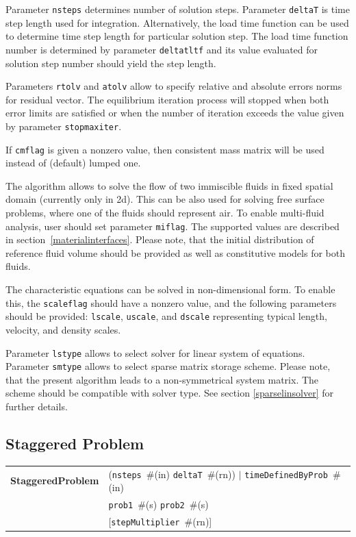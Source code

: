 \documentclass[a4paper]{article}
\makeatletter
\newcommand{\param}[1]{\texttt{#1}} %
\newcommand{\optional}[1]{[#1]} %
\newcommand{\field}[2]{\param{#1}~\#{\tiny(#2)}} %
\newcommand{\optField}[2]{\optional{\field{#1}{#2}}}
\newcommand{\entKeywordInst}[1]{\textbf{#1}} %
\newenvironment{record}[1][]{\begin{tabular}{|ll}}{\end{tabular}\\}
\newcommand{\recentry}[2]{{#1}&{#2}\\}
\newcounter{rcc}
\newenvironment{record}[1][\textwidth]{\setcounter{rcc}{0}\begin{tabular*}{#1}{|ll@{\extracolsep{\fill}}r}}{\end{tabular*}\\}
\newcommand{\recentry}[2]{\ifthenelse{\value{rcc}>0}{&$\backslash$ \\}{\setcounter{rcc}{1}}{#1}&{#2}}
\makeatother
\begin{document}
Parameter \param{nsteps} determines number of solution
steps. Parameter \param{deltaT} is time step length used for
integration. Alternatively, the load time function can be used to
determine time step length for particular solution step. The load time
function number is determined by parameter \param{deltatltf} and its
value evaluated for solution step number should yield the step length.

Parameters \param{rtolv} and \param{atolv} allow to
specify relative and absolute errors norms for residual vector.
The equilibrium iteration process will stopped when both error limits
are satisfied or when the number of iteration exceeds the value given
by parameter \param{stopmaxiter}.

If \param{cmflag} is given a nonzero value, then
consistent mass matrix will be used instead of (default) lumped one.

The algorithm allows to solve the flow of two immiscible fluids in
fixed spatial domain (currently only in 2d). This can be also used for
solving free surface problems, where one of the fluids should
represent air. To enable multi-fluid analysis, user should set parameter \param{miflag}. The supported values are described in section~\ref{materialinterfaces}.
Please note, that the initial distribution of reference fluid
volume should be provided as well as
constitutive models for both fluids.


The characteristic equations can be solved in non-dimensional form. To
enable this, the \param{scaleflag} should have a nonzero value,
and the following parameters should be provided: \param{lscale},
\param{uscale}, and \param{dscale} representing typical length,
velocity, and density scales.

Parameter \param{lstype} allows to select solver for linear system of
equations. Parameter \param{smtype} allows to select sparse matrix storage
scheme. Please note, that the present algorithm leads to a
non-symmetrical system
matrix. The scheme should be compatible with solver type. See section
\ref{sparselinsolver} for further details.

\subsection{Staggered Problem}
\label{staggeredproblem}
\begin{record}
  \recentry{\entKeywordInst{StaggeredProblem}}{(\field{nsteps}{in} \field{deltaT}{rn}) $|$ \field{timeDefinedByProb}{in}}
  \recentry{}{\field{prob1}{s} \field{prob2}{s}}
  \recentry{}{\optField{stepMultiplier}{rn}}
\end{record}
\end{document}

